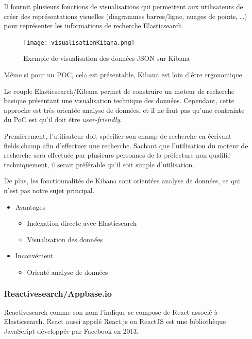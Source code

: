 Il fournit plusieurs fonctions de visualisations qui permettent aux utilisateurs de créer des représentations visuelles (diagrammes barres/ligne, nuages de points, \ldots) pour représenter les informations de recherche Elasticsearch.

\begin{figure}[h!]
  \centering
  \texttt{[image: visualisationKibana.png]}
	\caption[]{Exemple de visualisation des données JSON sur Kibana}
	\label{}
\end{figure}
Même si pour un POC, cela est présentable, Kibana est loin d’être ergonomique.

Le couple Elasticsearch/Kibana permet de construire un moteur de recherche basique présentant une visualisation technique des données.
Cependant, cette approche est très orientée analyse de données, et il ne faut pas qu'une contrainte du PoC est qu'il doit être \textit{user-friendly}.

Premièrement, l'utilisateur doit spécifier son champ de recherche en écrivant fields.champ afin d’effectuer une recherche.
Sachant que l'utilisation du moteur de recherche sera effectuée par plusieurs personnes de la préfecture non qualifié techniquement, il serait préférable qu'il soit simple d'utilisation.

De plus, les fonctionnalités de Kibana sont orientées analyse de données, ce qui n'est pas notre sujet principal.

\begin{itemize}
    \item Avantages 
        \begin{itemize}
            \item Indexation directe avec Elasticsearch
            \item Visualisation des données
        \end{itemize}
    \item Inconvénient 
        \begin{itemize}
        \item Orienté analyse de données
        \end{itemize}
\end{itemize}


\subsubsection{Reactivesearch/Appbase.io}
Reactivesearch comme son nom l'indique se compose de React associé à Elasticsearch.
React aussi appelé React.js ou ReactJS est une bibliothèque JavaScript développée par Facebook en 2013.

